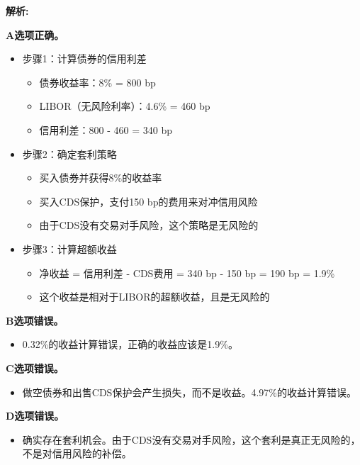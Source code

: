\documentclass{article}
\newenvironment{explanation}
{\textbf{解析:}\par}
{\par}
\begin{document}
\begin{explanation}

    \textbf{A选项正确。}

    \begin{itemize}
        \item 步骤1：计算债券的信用利差
        \begin{itemize}
            \item 债券收益率：8\% = 800 bp
            \item LIBOR（无风险利率）：4.6\% = 460 bp
            \item 信用利差：800 - 460 = 340 bp
        \end{itemize}

        \item 步骤2：确定套利策略
        \begin{itemize}
            \item 买入债券并获得8\%的收益率
            \item 买入CDS保护，支付150 bp的费用来对冲信用风险
            \item 由于CDS没有交易对手风险，这个策略是无风险的
        \end{itemize}

        \item 步骤3：计算超额收益
        \begin{itemize}
            \item 净收益 = 信用利差 - CDS费用 = 340 bp - 150 bp = 190 bp = 1.9\%
            \item 这个收益是相对于LIBOR的超额收益，且是无风险的
        \end{itemize}
    \end{itemize}

    \textbf{B选项错误。}
    \begin{itemize}
        \item 0.32\%的收益计算错误，正确的收益应该是1.9\%。
    \end{itemize}

    \textbf{C选项错误。}
    \begin{itemize}
        \item 做空债券和出售CDS保护会产生损失，而不是收益。4.97\%的收益计算错误。
    \end{itemize}

    \textbf{D选项错误。}
    \begin{itemize}
        \item 确实存在套利机会。由于CDS没有交易对手风险，这个套利是真正无风险的，不是对信用风险的补偿。
    \end{itemize}

\end{explanation}
\end{document}
